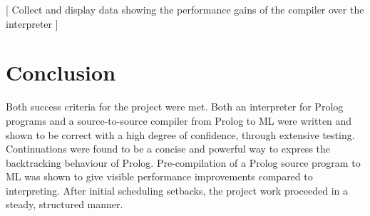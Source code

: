 \documentclass[12pt]{article}
\begin{document}
[ Collect and display data showing the performance gains of the compiler over the interpreter ]


\newpage

\section{Conclusion}

Both success criteria for the project were met. Both an interpreter for Prolog programs and a source-to-source compiler from Prolog to ML were written and shown to be correct with a high degree of confidence, through extensive testing. Continuations were found to be a concise and powerful way to express the backtracking behaviour of Prolog. Pre-compilation of a Prolog source program to ML was shown to give visible performance improvements compared to interpreting. After initial scheduling setbacks, the project work proceeded in a steady, structured manner. 
\end{document}
